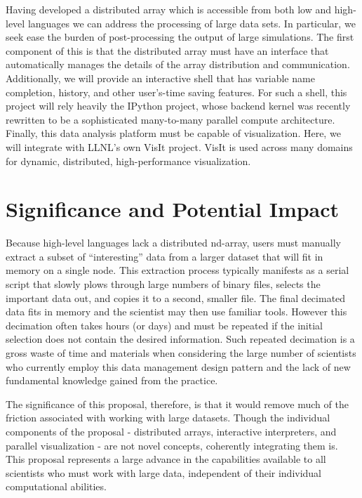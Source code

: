 \documentclass[letterpaper,11pt]{article}
\begin{document}
Having developed a distributed array which is accessible from both low and high-level 
languages we can address the processing of large data sets.  In particular, we seek 
ease the burden of post-processing the output of large simulations. 
The first component of this is that the distributed array must have an interface that 
automatically manages the details of the array distribution and communication.  
Additionally, we will provide an interactive shell that has variable name completion, 
history, and other user's-time saving features.  For such a shell, this project will 
rely heavily the IPython project, whose backend kernel was recently rewritten to be a 
sophisticated many-to-many parallel compute architecture.  Finally, this data analysis 
platform must be capable of visualization.  Here, we will integrate with LLNL's own VisIt 
project.  VisIt is used across many domains for dynamic, distributed, 
high-performance visualization.


\section*{Significance and Potential Impact}

Because high-level languages lack a distributed nd-array, users must manually extract a subset
 of ``interesting'' data from a larger dataset that will fit in memory on a single node.  This extraction process typically manifests 
as a serial script that slowly plows through large numbers of binary files, selects the 
important data out, and copies it to a second, smaller file.  The final decimated data fits 
in memory and the scientist may then use familiar tools.   However this decimation often takes 
hours (or days) and must be repeated if the initial selection does not contain the desired 
information.  Such repeated decimation is a gross waste of time and materials when considering 
the large number of scientists who currently employ this data management design pattern and
the lack of new fundamental knowledge gained from the practice.

The significance of this proposal, therefore, is that it would remove much of the friction 
associated with working with large datasets.  Though the individual components of the 
proposal - distributed arrays, interactive interpreters, and parallel visualization - are 
not novel concepts, coherently integrating them is.  This proposal represents a large 
advance in the capabilities available to all scientists who must work with large data, 
independent of their individual computational abilities.
\end{document}
